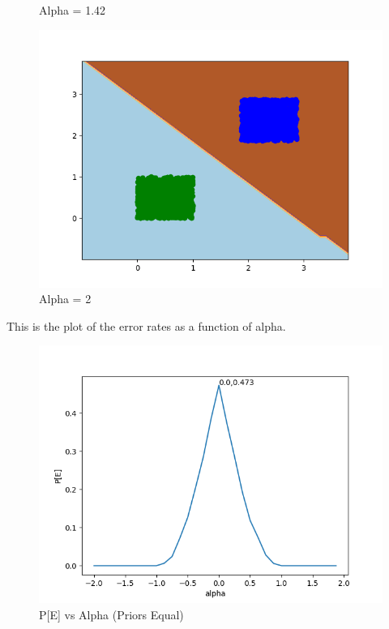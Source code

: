 \documentclass{article}
\begin{document}
\begin{figure}[!htb]
\begin{minipage}{0.24\textwidth}
		\caption{Alpha = 1.42}
	\end{minipage}
	\begin{minipage}{0.24\textwidth}
		\centering
		\includegraphics[width=1\linewidth]{../equalpriors/this31.png}
		\caption{Alpha = 2}
	\end{minipage}
\end{figure}
This is the plot of the error rates as a function of alpha.
\begin{figure}[!htb]
	\begin{minipage}{0.99\textwidth}
		\centering
		\includegraphics[width=1\linewidth]{../equalpriors/results.png}
		\caption{P[E] vs Alpha (Priors Equal)}
	\end{minipage}
\end{figure}
\clearpage
\end{document}
